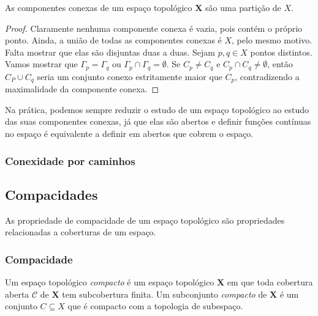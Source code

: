 \begin{proposition}
As componentes conexas de um espaço topológico $\bm X$ são uma partição de $X$.
\end{proposition}
\begin{proof}
Claramente nenhuma componente conexa é vazia, pois contém o próprio ponto. Ainda, a união de todas as componentes conexas é $X$, pelo mesmo motivo. Falta mostrar que elas são disjuntas duas a duas. Sejam $p,q \in X$ pontos distintos. Vamos mostrar que $\Gamma_p = \Gamma_q$ ou $\Gamma_p \cap \Gamma_q = \emptyset$. Se $C_p \neq C_q$ e $C_p \cap C_q \neq \emptyset$, então $C_P \cup C_q$ seria um conjunto conexo estritamente maior que $C_p$, contradizendo a maximalidade da componente conexa.
\end{proof}

Na prática, podemos sempre reduzir o estudo de um espaço topológico ao estudo das suas componentes conexas, já que elas são abertos e definir funções contínuas no espaço é equivalente a definir em abertos que cobrem o espaço.

\subsubsection{Conexidade por caminhos}
























\subsection{Compacidades}

As propriedade de compacidade de um espaço topológico são propriedades relacionadas a coberturas de um espaço.

\subsubsection{Compacidade}

\begin{definition}
Um espaço topológico \emph{compacto} é um espaço topológico $\bm X$ em que toda cobertura aberta $\mathcal C$ de $\bm X$ tem subcobertura finita. Um subconjunto \emph{compacto} de $\bm X$ é um conjunto $C \subseteq X$ que é compacto com a topologia de subespaço.
\end{definition}

